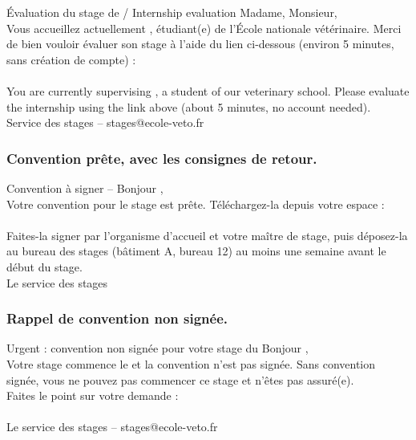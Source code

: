 \documentclass[11pt,a4paper]{article}
\begin{document}
\begin{courriel}{Évaluation du stage de  / Internship evaluation}
Madame, Monsieur,\\[4pt]
Vous accueillez actuellement , étudiant(e) de l'École nationale
vétérinaire. Merci de bien vouloir évaluer son stage à l'aide du lien
ci-dessous (environ 5 minutes, sans création de compte) :\\
\\[4pt]
You are currently supervising , a student of our veterinary school.
Please evaluate the internship using the link above (about 5 minutes, no
account needed).\\[4pt]
Service des stages -- stages@ecole-veto.fr
\end{courriel}

\subsubsection*{Convention prête, avec les consignes de retour.}

\begin{courriel}{Convention à signer -- }
Bonjour ,\\[4pt]
Votre convention pour le stage \og {}\fg{} est prête. Téléchargez-la
depuis votre espace :\\
\\[4pt]
Faites-la signer par l'organisme d'accueil et votre maître de stage, puis
déposez-la au bureau des stages (bâtiment A, bureau 12) au moins une semaine
avant le début du stage.\\[4pt]
Le service des stages
\end{courriel}

\subsubsection*{Rappel de convention non signée.}

\begin{courriel}{Urgent : convention non signée pour votre stage du }
Bonjour ,\\[4pt]
Votre stage \og {}\fg{} commence le  et la convention
n'est pas signée. Sans convention signée, vous ne pouvez pas commencer ce stage
et n'êtes pas assuré(e).\\[4pt]
Faites le point sur votre demande :\\
\\[4pt]
Le service des stages -- stages@ecole-veto.fr
\end{courriel}
\end{document}
